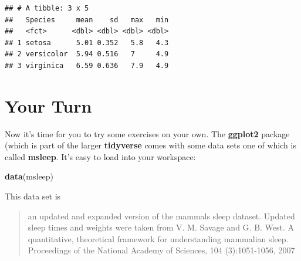 \documentclass[]{book}
\newenvironment{Shaded}{\begin{snugshade}}{\end{snugshade}}
\newcommand{\DataTypeTok}[1]{\textcolor[rgb]{0.13,0.29,0.53}{#1}}
\newcommand{\KeywordTok}[1]{\textcolor[rgb]{0.13,0.29,0.53}{\textbf{#1}}}
\newcommand{\NormalTok}[1]{#1}
\newcommand{\OperatorTok}[1]{\textcolor[rgb]{0.81,0.36,0.00}{\textbf{#1}}}
\newcommand{\StringTok}[1]{\textcolor[rgb]{0.31,0.60,0.02}{#1}}
\begin{document}
\begin{Shaded}
\end{Shaded}

\begin{verbatim}
## # A tibble: 3 x 5
##   Species     mean    sd   max   min
##   <fct>      <dbl> <dbl> <dbl> <dbl>
## 1 setosa      5.01 0.352   5.8   4.3
## 2 versicolor  5.94 0.516   7     4.9
## 3 virginica   6.59 0.636   7.9   4.9
\end{verbatim}

\hypertarget{your-turn}{%
\chapter{Your Turn}\label{your-turn}}

Now it's time for you to try some exercises on your own. The \textbf{ggplot2} package (which is part of the larger \textbf{tidyverse} comes with some data sets one of which is called \textbf{msleep}. It's easy to load into your workspace:

\begin{Shaded}
\begin{Highlighting}[]
\KeywordTok{data}\NormalTok{(msleep)}
\end{Highlighting}
\end{Shaded}

This data set is

\begin{quote}
an updated and expanded version of the mammals sleep dataset. Updated sleep times and weights were taken from V. M. Savage and G. B. West. A quantitative, theoretical framework for understanding mammalian sleep. Proceedings of the National Academy of Sciences, 104 (3):1051-1056, 2007
\end{quote}
\end{document}
